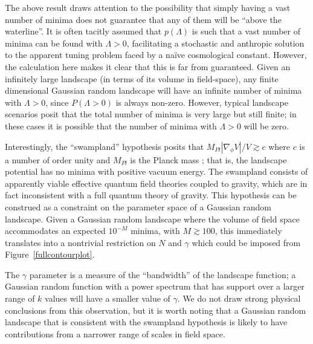 \documentclass[12pt]{article}
\begin{document}
The above result draws attention to the possibility that simply having a vast number of minima does not guarantee that any of them will be ``above the waterline''.  It is often tacitly assumed that $p(\Lambda)$ is such that a vast number of minima can be found with $\Lambda>0$, facilitating a stochastic and anthropic solution to the apparent tuning problem faced by a na\"ive cosmological constant. However, the calculation here makes it clear that this is far from guaranteed. Given an infinitely large landscape (in terms of its volume in field-space), any finite dimensional Gaussian random landscape will have an infinite number of minima with $\Lambda>0$, since $P(\Lambda >0)$ is always non-zero. However, typical landscape scenarios posit that the total number of minima is very large but still finite; in these cases it is possible that the number of minima with $\Lambda >0$ will be zero.  

Interestingly, the ``swampland'' hypothesis posits that $M_{Pl} |\nabla_\phi V|/ V \gtrsim c$ where $c$ is a number of order unity and $M_{Pl}$ is the Planck mass \cite{Agrawal2018,Ooguri:2018wrx}; that is, the landscape potential has no minima with  positive vacuum energy. The swampland consists of apparently viable effective quantum field theories coupled to gravity, which are in fact inconsistent with a full quantum theory of gravity. This hypothesis can be construed as a constraint on the parameter space of a Gaussian random landscape. Given a Gaussian random landscape where the volume of field space accommodates an expected $10^{-M}$ minima, with $M\gtrsim 100$, this immediately translates into a nontrivial restriction on $N$ and $\gamma$ which could be imposed from  Figure~\ref{fullcontourplot}. 

The $\gamma$  parameter is a measure of the ``bandwidth'' of the landscape function; a Gaussian random function with a power spectrum that has support over a larger range of $k$ values will have a smaller value of $\gamma$. We do not draw strong physical conclusions from this observation, but it is worth noting that a Gaussian random landscape that is consistent with the swampland hypothesis is likely to have contributions from a narrower range of scales in field space. 
\end{document}
